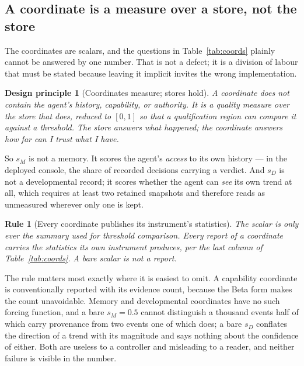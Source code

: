 \documentclass[11pt]{article}
\newtheorem{principle}{Design principle}
\newtheorem{drule}{Rule}
\begin{document}
\subsection{A coordinate is a measure over a store, not the store}
\label{sec:coordvsstore}

The coordinates are scalars, and the questions in Table~\ref{tab:coords} plainly cannot be answered by one number. That is not a defect; it is a division of labour that must be stated because leaving it implicit invites the wrong implementation.

\begin{principle}[Coordinates measure; stores hold]
\label{prin:measure}
A coordinate does not contain the agent's history, capability, or authority. It is a \emph{quality measure over the store that does}, reduced to $[0,1]$ so that a qualification region can compare it against a threshold. The store answers \emph{what happened}; the coordinate answers \emph{how far can I trust what I have}.
\end{principle}

So $s_M$ is not a memory. It scores the agent's \emph{access} to its own history --- in the deployed console, the share of recorded decisions carrying a verdict. And $s_D$ is not a developmental record; it scores whether the agent can \emph{see} its own trend at all, which requires at least two retained snapshots and therefore reads as unmeasured wherever only one is kept.

\begin{drule}[Every coordinate publishes its instrument's statistics]
\label{rule:publish}
The scalar is only ever the summary used for threshold comparison. Every report of a coordinate carries the statistics its own instrument produces, per the last column of Table~\ref{tab:coords}. A bare scalar is not a report.
\end{drule}

The rule matters most exactly where it is easiest to omit. A capability coordinate is conventionally reported with its evidence count, because the Beta form makes the count unavoidable. Memory and developmental coordinates have no such forcing function, and a bare $s_M=0.5$ cannot distinguish a thousand events half of which carry provenance from two events one of which does; a bare $s_D$ conflates the direction of a trend with its magnitude and says nothing about the confidence of either. Both are useless to a controller and misleading to a reader, and neither failure is visible in the number.
\end{document}

